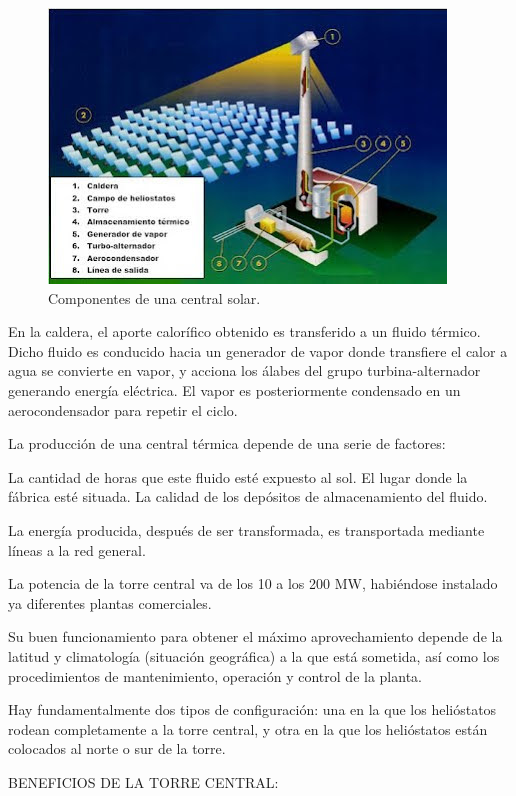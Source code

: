 \begin{figure}[h!]
  	\centering
	\includegraphics[scale=1]{FotosPaginasWebHeliostatos/unnamed(2).jpg}
	\caption{Componentes de una central solar.
	\label{fig:FotosPaginasWebHeliostatos/unnamed(2).jpg}}
\end{figure}

En la caldera, el aporte calorífico obtenido es transferido a un fluido térmico. Dicho fluido es conducido hacia un generador de vapor donde transfiere el calor a agua se convierte en vapor, y acciona los álabes del grupo turbina-alternador generando energía eléctrica. El vapor es posteriormente condensado en un aerocondensador para repetir el ciclo.

La producción de una central térmica depende de una serie de factores:

La cantidad de horas que este fluido esté expuesto al sol.
El lugar donde la fábrica esté situada.
La calidad de los depósitos de almacenamiento del fluido.

La energía producida, después de ser transformada, es transportada mediante líneas a la red general. \cite{LuciaRinconWebSite}

La potencia de la torre central va de los 10 a los 200 MW, habiéndose instalado ya diferentes plantas comerciales.

Su buen funcionamiento para obtener el máximo aprovechamiento depende de la latitud y climatología (situación geográfica) a la que está sometida, así como los procedimientos de mantenimiento, operación y control de la planta.

Hay fundamentalmente dos tipos de configuración: una en la que los helióstatos rodean completamente a la torre central, y otra en la que los helióstatos están colocados al norte o sur de la torre.

BENEFICIOS DE LA TORRE CENTRAL:

